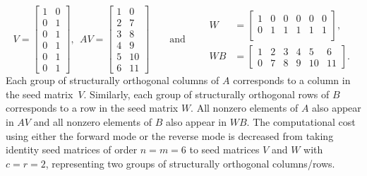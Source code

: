 \documentclass[12pt, oneside]{book}
\newcommand{\col}{\ensuremath{c}}
\newcommand{\row}{\ensuremath{r}}
\begin{document}
$$
V =
\begin{bmatrix}
 1  & 0 \\
 0  & 1 \\
 0  & 1 \\
 0  & 1 \\
 0  & 1 \\
 0  & 1
\end{bmatrix},\;\,
%
AV =
\begin{bmatrix}
 1  & 0 \\
 2  & 7 \\
 3  & 8 \\
 4  & 9 \\
 5  & 10\\
 6  & 11
\end{bmatrix}
\qquad\text{and}\qquad
\begin{aligned}
  W &=
    \begin{bmatrix}
     1  & 0 & 0 & 0 & 0 & 0\\
     0  & 1 & 1 & 1 & 1 & 1\\
    \end{bmatrix}, \\[1em]
  WB &=
     \begin{bmatrix}
      1  & 2 & 3 & 4 & 5 & 6\\
      0  & 7 & 8 & 9 & 10 & 11
     \end{bmatrix}.
\end{aligned}
$$
Each group of structurally orthogonal columns of $A$ corresponds to a column in the seed
matrix~$V$. Similarly, each group of structurally orthogonal rows of $B$ corresponds to a
row in the seed matrix $W$. All nonzero elements of $A$ also appear in $AV$ and all
nonzero elements of $B$ also appear in $WB$. The computational cost using either the
forward mode or the reverse mode is decreased from taking identity seed matrices of order
$n=m=6$ to seed matrices $V$ and $W$ with $\col = \row = 2$, representing two groups of
structurally orthogonal columns/rows.
\end{document}
